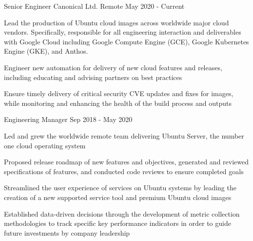 

\begin{cventries}

  \cventry
    {Senior Engineer}
    {Canonical Ltd.}
    {Remote}
    {May 2020 - Current}
    {
      \begin{cvitems}
        \item {
          Lead the production of Ubuntu cloud images across worldwide major
          cloud vendors. Specifically, responsible for all engineering
          interaction and deliverables with Google Cloud including Google
          Compute Engine (GCE), Google Kubernetes Engine (GKE), and Anthos.
        }
        \item {
          Engineer new automation for delivery of new cloud features and
          releases, including educating and advising partners on best
          practices
        }
        \item {
          Ensure timely delivery of critical security CVE updates and fixes
          for images, while monitoring and enhancing the health of the build
          process and outputs
        }
      \end{cvitems}
    }
    {}

  \cventry
    {Engineering Manager}
    {}
    {}
    {Sep 2018 - May 2020}
    {
      \begin{cvitems}
        \item {
          Led and grew the worldwide remote team delivering Ubuntu Server,
          the number one cloud operating system
        }
        \item {
          Proposed release roadmap of new features and objectives, generated
          and reviewed specifications of features, and conducted code reviews
          to ensure completed goals
        }
        \item {
          Streamlined the user experience of services on Ubuntu systems by
          leading the creation of a new supported service tool and premium
          Ubuntu cloud images
        }
        \item {
          Established data-driven decisions through the development of metric
          collection methodologies to track specific key performance
          indicators in order to guide future investments by company
          leadership
        }
      \end{cvitems}
    }
    {}


\end{cventries}
